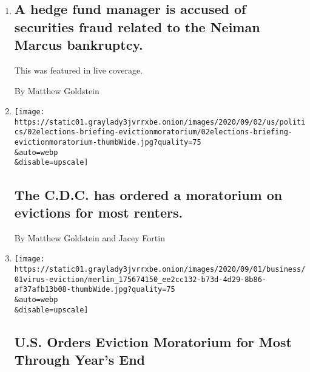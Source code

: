 \begin{enumerate}
\def\labelenumi{\arabic{enumi}.}
\item
  \href{/live/2020/09/03/business/stock-market-today-coronavirus/a-hedge-fund-manager-is-accused-of-securities-fraud-related-to-the-neiman-marcus-bankruptcy}{}

  \hypertarget{a-hedge-fund-manager-is-accused-of-securities-fraud-related-to-the-neiman-marcus-bankruptcy}{%
  \subsection{A hedge fund manager is accused of securities fraud
  related to the Neiman Marcus
  bankruptcy.}\label{a-hedge-fund-manager-is-accused-of-securities-fraud-related-to-the-neiman-marcus-bankruptcy}}

  This was featured in live coverage.

  By Matthew Goldstein
\item
  \href{/2020/09/02/us/elections/the-cdc-has-ordered-a-moratorium-on-evictions-for-most-renters.html}{}

  \texttt{[image: https://static01.graylady3jvrrxbe.onion/images/2020/09/02/us/politics/02elections-briefing-evictionmoratorium/02elections-briefing-evictionmoratorium-thumbWide.jpg?quality=75\\\&auto=webp\\\&disable=upscale]}

  \hypertarget{the-cdc-has-ordered-a-moratorium-on-evictions-for-most-renters}{%
  \subsection{The C.D.C. has ordered a moratorium on evictions for most
  renters.}\label{the-cdc-has-ordered-a-moratorium-on-evictions-for-most-renters}}

  By Matthew Goldstein and Jacey Fortin
\item
  \href{/2020/09/01/business/eviction-moratorium-order.html}{}

  \texttt{[image: https://static01.graylady3jvrrxbe.onion/images/2020/09/01/business/01virus-eviction/merlin\_175674150\_ee2cc132-b73d-4d29-8b86-af37afb13b08-thumbWide.jpg?quality=75\\\&auto=webp\\\&disable=upscale]}

  \hypertarget{us-orders-eviction-moratorium-for-most-through-years-end}{%
  \subsection{U.S. Orders Eviction Moratorium for Most Through Year's
  End}\label{us-orders-eviction-moratorium-for-most-through-years-end}}


\end{enumerate}
